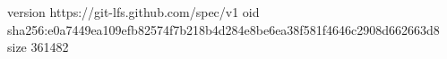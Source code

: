 version https://git-lfs.github.com/spec/v1
oid sha256:e0a7449ea109efb82574f7b218b4d284e8be6ea38f581f4646c2908d662663d8
size 361482

